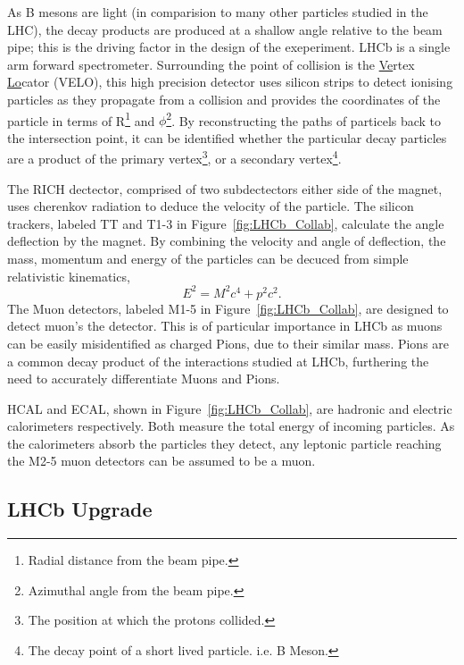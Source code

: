     As B mesons are light (in comparision to many other particles studied in the LHC), the decay products are produced at a shallow angle relative to the beam pipe;
    this is the driving factor in the design of the exeperiment. 
    LHCb is a single arm forward spectrometer.
    Surrounding the point of collision is the \underline{Ve}rtex \underline{Lo}cator (VELO), this high precision detector uses silicon strips to detect ionising particles as they propagate from a collision and provides the coordinates of the particle in terms of R\footnote{Radial distance from the beam pipe.} and $\phi$\footnote{Azimuthal angle from the beam pipe.}.
    By reconstructing the paths of particels back to the intersection point, it can be identified whether the particular decay particles are a product of the primary vertex\footnote{The position at which the protons collided.}, or a secondary vertex\footnote{The decay point of a short lived particle. i.e. B Meson.}.
    \par
    The RICH dectector, comprised of two subdectectors either side of the magnet, uses cherenkov radiation to deduce the velocity of the particle. The silicon trackers, labeled TT and T1-3 in Figure~\ref{fig:LHCb_Collab}, calculate the angle deflection by the magnet. 
    By combining the velocity and angle of deflection, the mass, momentum and energy of the particles can be decuced from simple relativistic kinematics,
    \begin{equation}
      E^2 = M^2c^4 + p^2c^2.
    \end{equation}
    The Muon detectors, labeled M1-5 in Figure~\ref{fig:LHCb_Collab}, are designed to detect muon's the detector. 
    This is of particular importance in LHCb as muons can be easily misidentified as charged Pions, due to their similar mass.
    Pions are a common decay product of the interactions studied at LHCb, furthering the need to accurately differentiate Muons and Pions.
    \par
    HCAL and ECAL, shown in Figure~\ref{fig:LHCb_Collab}, are hadronic and electric calorimeters respectively. 
    Both measure the total energy of incoming particles.
    As the calorimeters absorb the particles they detect, any leptonic particle reaching the M2-5 muon detectors can be assumed to be a muon.

  \subsection{LHCb Upgrade} %
  \label{sub:lhcb_upgrade}

